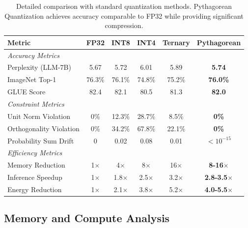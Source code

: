 \documentclass{article}
\begin{document}
\begin{table}[h]
\centering
\begin{tabular}{lccccc}
\toprule
\textbf{Metric} & \textbf{FP32} & \textbf{INT8} & \textbf{INT4} & \textbf{Ternary} & \textbf{Pythagorean} \\
\midrule
\multicolumn{6}{l}{\textit{Accuracy Metrics}} \\
Perplexity (LLM-7B) & 5.67 & 5.72 & 6.01 & 5.89 & \textbf{5.74} \\
ImageNet Top-1 & 76.3\% & 76.1\% & 74.8\% & 75.2\% & \textbf{76.0\%} \\
GLUE Score & 82.4 & 82.1 & 80.5 & 81.3 & \textbf{82.0} \\
\midrule
\multicolumn{6}{l}{\textit{Constraint Metrics}} \\
Unit Norm Violation & 0\% & 12.3\% & 28.7\% & 8.5\% & \textbf{0\%} \\
Orthogonality Violation & 0\% & 34.2\% & 67.8\% & 22.1\% & \textbf{0\%} \\
Probability Sum Drift & 0 & 0.02 & 0.08 & 0.01 & \textbf{$< 10^{-15}$} \\
\midrule
\multicolumn{6}{l}{\textit{Efficiency Metrics}} \\
Memory Reduction & 1$\times$ & 4$\times$ & 8$\times$ & 16$\times$ & \textbf{8-16$\times$} \\
Inference Speedup & 1$\times$ & 1.8$\times$ & 2.5$\times$ & 3.2$\times$ & \textbf{2.8-3.5$\times$} \\
Energy Reduction & 1$\times$ & 2.1$\times$ & 3.8$\times$ & 5.2$\times$ & \textbf{4.0-5.5$\times$} \\
\bottomrule
\end{tabular}
\caption{Detailed comparison with standard quantization methods. Pythagorean Quantization achieves accuracy comparable to FP32 while providing significant compression.}
\end{table}

\subsection{Memory and Compute Analysis}
\end{document}
